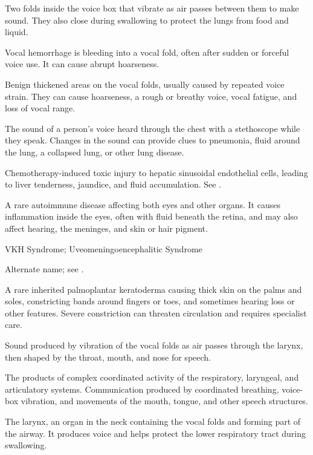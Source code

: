 Two folds inside the voice box that vibrate as air passes between them to make sound. They also close during swallowing to protect the lungs from food and liquid.

 Vocal hemorrhage is bleeding into a vocal fold, often after sudden or forceful voice use. It can cause abrupt hoarseness.

 Benign thickened areas on the vocal folds, usually caused by repeated voice strain. They can cause hoarseness, a rough or breathy voice, vocal fatigue, and loss of vocal range.

 The sound of a person’s voice heard through the chest with a stethoscope while they speak. Changes in the sound can provide clues to pneumonia, fluid around the lung, a collapsed lung, or other lung disease.

 Chemotherapy-induced toxic injury to hepatic sinusoidal endothelial cells, leading to liver tenderness, jaundice, and fluid accumulation. See .

 A rare autoimmune disease affecting both eyes and other organs. It causes inflammation inside the eyes, often with fluid beneath the retina, and may also affect hearing, the meninges, and skin or hair pigment.

\synonyms
VKH Syndrome; Uveomeningoencephalitic Syndrome

 Alternate name; see .

 A rare inherited palmoplantar keratoderma causing thick skin on the palms and soles, constricting bands around fingers or toes, and sometimes hearing loss or other features. Severe constriction can threaten circulation and requires specialist care.

 Sound produced by vibration of the vocal folds as air passes through the larynx, then shaped by the throat, mouth, and nose for speech.

 The products of complex coordinated activity of the respiratory, laryngeal, and articulatory systems. Communication produced by coordinated breathing, voice-box vibration, and movements of the mouth, tongue, and other speech structures.

 The larynx, an organ in the neck containing the vocal folds and forming part of the airway. It produces voice and helps protect the lower respiratory tract during swallowing.

